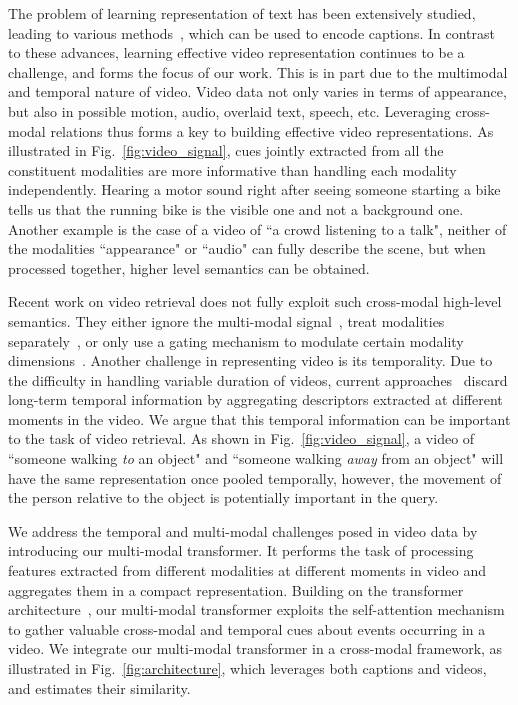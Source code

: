 \documentclass[runningheads]{llncs}
\begin{document}
The problem of learning representation of text has been extensively studied, leading to various methods~\cite{Zhang2010BagOfWords,Mikolov2013Word2Vec,vaswani2017transformer,Hochreiter1997lstm,devlin2018bert}, which can be used to encode captions. In contrast to these advances, learning effective video representation continues to be a challenge, and forms the focus of our work. This is in part due to the multimodal and temporal nature of video. Video data not only varies in terms of appearance, but also in possible motion, audio, overlaid text, speech, etc. Leveraging cross-modal relations thus forms a key to building effective video representations. As illustrated in Fig.~\ref{fig:video_signal}, cues jointly extracted from all the constituent modalities are more informative than handling each modality independently. Hearing a motor sound right after seeing someone starting a bike tells us that the running bike is the visible one and not a background one. Another example is the case of a video of ``a crowd listening to a talk", neither of the modalities ``appearance" or ``audio" can fully describe the scene, but when processed together, higher level semantics can be obtained.

Recent work on video retrieval does not fully exploit such cross-modal high-level semantics. They either ignore the multi-modal signal~\cite{miech2019MIL-NCE}, treat modalities separately~\cite{miech2018learning}, or only use a gating mechanism to modulate certain modality dimensions~\cite{liu2019use}.  
Another challenge in representing video is its temporality. Due to the difficulty in handling variable duration of videos, current approaches~\cite{miech2018learning,liu2019use} discard long-term temporal information by aggregating descriptors extracted at different moments in the video. We argue that this temporal information can be important to the task of video retrieval.
As shown in Fig.~\ref{fig:video_signal}, a video of ``someone walking \textit{to} an object" and ``someone walking \textit{away} from an object" will have the same representation once pooled temporally, however, the movement of the person relative to the object is potentially important in the query.

We address the temporal and multi-modal challenges posed in video data by introducing our multi-modal transformer. 
It performs the task of processing features extracted from different modalities at different moments in video and aggregates them in a compact representation.
Building on the transformer architecture~\cite{vaswani2017transformer}, our multi-modal transformer exploits the self-attention mechanism to gather valuable cross-modal and temporal cues about events occurring in a video. We integrate our multi-modal transformer in a cross-modal framework, as illustrated in Fig.~\ref{fig:architecture}, which leverages both captions and videos, and estimates their similarity.
\end{document}
